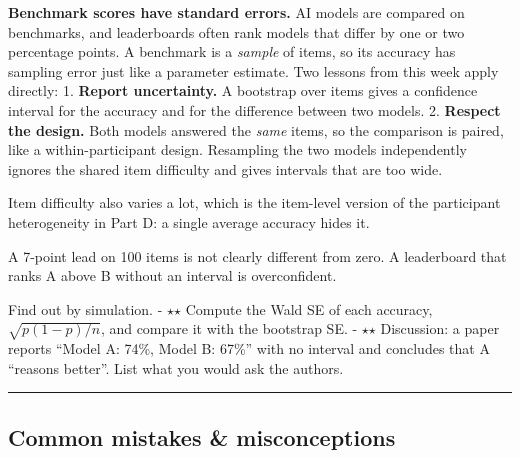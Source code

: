 \textbf{Benchmark scores have standard errors.} AI models are compared
on benchmarks, and leaderboards often rank models that differ by one or
two percentage points. A benchmark is a \emph{sample} of items, so its
accuracy has sampling error just like a parameter estimate. Two lessons
from this week apply directly: 1. \textbf{Report uncertainty.} A
bootstrap over items gives a confidence interval for the accuracy and
for the difference between two models. 2. \textbf{Respect the design.}
Both models answered the \emph{same} items, so the comparison is paired,
like a within-participant design. Resampling the two models
independently ignores the shared item difficulty and gives intervals
that are too wide.

Item difficulty also varies a lot, which is the item-level version of
the participant heterogeneity in Part D: a single average accuracy hides
it.

A 7-point lead on 100 items is not clearly different from zero. A
leaderboard that ranks A above B without an interval is overconfident.

Find out by simulation. - \ensuremath{\star}\ensuremath{\star} Compute the Wald SE of each accuracy,
\(\sqrt{p(1-p)/n}\), and compare it with the bootstrap SE. - \ensuremath{\star}\ensuremath{\star}
Discussion: a paper reports ``Model A: 74\%, Model B: 67\%'' with no
interval and concludes that A ``reasons better''. List what you would
ask the authors.

\begin{center}\rule{0.5\linewidth}{0.5pt}\end{center}

\subsection{Common mistakes \& misconceptions}

